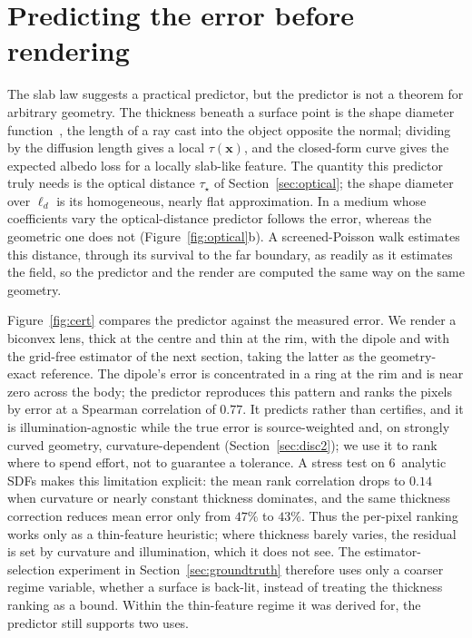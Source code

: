 \documentclass[11pt]{article}
\providecommand{\RCertRho}{0.00}
\providecommand{\RCertStressShapes}{0}
\providecommand{\RCertStressRho}{0.00}
\providecommand{\RCertStressDipErr}{0}
\providecommand{\RCertStressCorrErr}{0}
\renewcommand{\RCertRho}{0.77}
\renewcommand{\RCertStressShapes}{6}
\renewcommand{\RCertStressRho}{0.14}
\renewcommand{\RCertStressDipErr}{47}
\renewcommand{\RCertStressCorrErr}{43}
\newcommand{\ld}{\ell_d}
\begin{document}
\section{Predicting the error before rendering}
\label{sec:cert}
The slab law suggests a practical predictor, but the predictor is not a theorem
for arbitrary geometry. The thickness beneath a surface point is the shape
diameter function~\cite{shapira2008}, the length of a ray cast into the object
opposite the normal; dividing by the diffusion length gives a local
$\tau(\mathbf{x})$, and the closed-form curve gives the expected albedo loss for
a locally slab-like feature. The quantity this predictor truly needs is the
optical distance $\tau_\star$ of Section~\ref{sec:optical}; the shape diameter
over $\ld$ is its homogeneous, nearly flat approximation. In a medium whose
coefficients vary the optical-distance predictor follows the error, whereas the
geometric one does not (Figure~\ref{fig:optical}b). A screened-Poisson walk
estimates this distance, through its survival to the far boundary, as readily as
it estimates the field, so the predictor and the render are computed the same way on the same geometry.

Figure~\ref{fig:cert} compares the predictor against the measured error. We
render a biconvex lens, thick at the centre and thin at the rim, with the dipole
and with the grid-free estimator of the next section, taking the latter as the
geometry-exact reference. The dipole's error is concentrated in a ring at the rim
and is near zero across the body; the predictor reproduces this pattern and
ranks the pixels by error at a Spearman correlation of $\RCertRho$. It predicts
rather than certifies, and it is illumination-agnostic while the true
error is source-weighted and, on strongly curved geometry, curvature-dependent
(Section~\ref{sec:disc2}); we use it to rank where to spend effort, not to
guarantee a tolerance. A stress test on \RCertStressShapes\ analytic SDFs makes
this limitation explicit: the mean rank correlation drops to
$\RCertStressRho$ when curvature or nearly constant thickness dominates, and the
same thickness correction reduces mean error only from $\RCertStressDipErr\%$ to
$\RCertStressCorrErr\%$. Thus the per-pixel ranking works only as a thin-feature heuristic; where
thickness barely varies, the residual is set by curvature and illumination,
which it does not see. The estimator-selection
experiment in Section~\ref{sec:groundtruth} therefore uses only a coarser regime
variable, whether a surface is back-lit, instead of treating the thickness
ranking as a bound. Within the thin-feature regime it was derived for, the
predictor still supports two uses.
\end{document}
